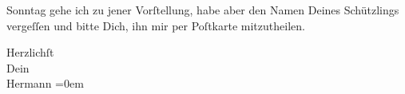 \pstart
           Sonntag gehe ich zu jener Vorſtellung, habe aber den Namen Deines Schützlings vergeſſen und bitte Dich, ihn
               mir per Poſtkarte mitzutheilen.\pend
           
\pstart
           Herzlichſt{\\[\baselineskip]}Dein{\\[\baselineskip]}\spacefill\mbox{Hermann}\pend
           \leftskip=0em{}\endnumbering{}  \newcommand{\dateiname}{L01115}\newcommand{\titel}{Hermann Bahr an Arthur Schnitzler, 25. 4. [1901]}\newcommand{\editorInnen}{Herausgegeben von Martin Anton Müller}
